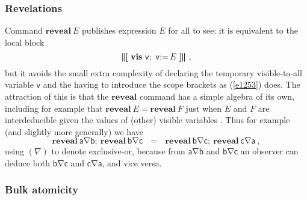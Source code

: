 \documentclass[runningheads]{llncs}
\newcommand\Vv {\mathsf{v}}
\newcommand\Va {\mathsf{a}}
\newcommand\Vb {\mathsf{b}}
\newcommand\Vc {\mathsf{c}}
\newcommand\Eqn[1] {(\ref{#1})}
\newcommand\Gets {{:}{=}\,}
\newcommand\Reveal {\textbf{reveal}}
\newcommand\Xor {\mathbin{\nabla}}
\newcommand\Vis {\textbf{vis}}
\newcommand{\Begin}{\mbox{\boldmath\textbf{$\parallel\kern-.365em[$}}}
\newcommand{\End}{\mbox{\boldmath\textbf{$]\kern-.365em\parallel$}}}
\newcommand\Wide[1] {~~~#1~~~}
\begin{document}
\subsubsection{Revelations}\label{s1423}
Command $\Reveal~E$  publishes expression $E$ for all to see: it is equivalent to the local block
\begin{equation}\label{e1253}
 \Begin~\Vis~\Vv;~ \Vv\Gets E~\End ~,
\end{equation}
but it avoids the small extra complexity of declaring the temporary visible-to-all variable $\Vv$ and the having to introduce the scope brackets as \Eqn{e1253} does. The attraction of this is that the $\Reveal$ command has a simple algebra of its own, including for example that $\Reveal~E = \Reveal~F$ just when $E$ and $F$ are interdeducible given the values of (other) visible variables \cite{McIver:08a,McIver:09a}. Thus for example (and slightly more generally) we have
\[
 \Reveal~\Va{\Xor}\Vb;~\Reveal~\Vb{\Xor}\Vc
 \Wide{=}
 \Reveal~\Vb{\Xor}\Vc;~\Reveal~\Vc{\Xor}\Va ~,
\]
using $(\Xor)$ to denote exclusive-or, because from $\Va{\Xor}\Vb$ and $\Vb{\Xor}\Vc$ an observer can deduce both $\Vb{\Xor}\Vc$ and $\Vc{\Xor}\Va$, and vice versa.


\subsubsection{Bulk atomicity}\label{s1044}
\end{document}
